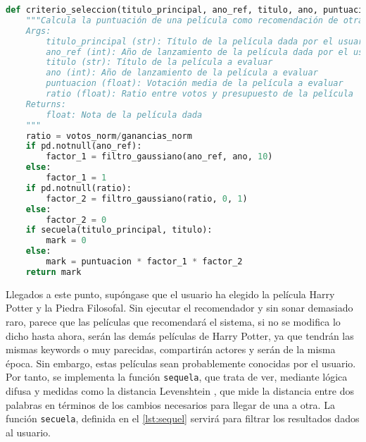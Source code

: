 \begin{lstlisting}[language=Python, caption= {Criterios de selección para la elección de las mejores películas. Se parte de la puntuación de la película y se modifica según la proximidad temporal de la película a evaluar con la película de referencia y el ratio entre votos e ingresos de la película.}, label={lst:criteria}]
def criterio_seleccion(titulo_principal, ano_ref, titulo, ano, puntuacion, votos_norm, ganancias_norm):
    """Calcula la puntuación de una película como recomendación de otra en base a la similaridad de su título, la distancia temporal entre ambos lanzamientos y el número de votos de la película evaluada y la puntuación de la película. Además, la similitud entre títulos se tiene en cuenta para evitar la recomendación de secuelas. Es decir, si dos películas tienen un nombre muy similar, se desechara como recomendación.
    Args:
        titulo_principal (str): Título de la película dada por el usuario
        ano_ref (int): Año de lanzamiento de la película dada por el usuario
        titulo (str): Título de la película a evaluar
        ano (int): Año de lanzamiento de la película a evaluar
        puntuacion (float): Votación media de la película a evaluar
        ratio (float): Ratio entre votos y presupuesto de la película
    Returns:
        float: Nota de la película dada
    """
    ratio = votos_norm/ganancias_norm
    if pd.notnull(ano_ref):
        factor_1 = filtro_gaussiano(ano_ref, ano, 10)
    else:
        factor_1 = 1        
    if pd.notnull(ratio):
        factor_2 = filtro_gaussiano(ratio, 0, 1)
    else:
        factor_2 = 0
    if secuela(titulo_principal, titulo):
        mark = 0
    else:
        mark = puntuacion * factor_1 * factor_2
    return mark
\end{lstlisting}

Llegados a este punto, supóngase que el usuario ha elegido la película Harry Potter y la Piedra Filosofal. Sin ejecutar el recomendador y sin sonar demasiado raro, parece que las películas que recomendará el sistema, si no se modifica lo dicho hasta ahora, serán las demás películas de Harry Potter, ya que tendrán las mismas keywords o muy parecidas, compartirán actores y serán de la misma época. Sin embargo, estas películas sean probablemente conocidas por el usuario. Por tanto, se implementa la función \texttt{sequela}, que trata de ver, mediante lógica difusa y medidas como la distancia Levenshtein \cite{levenshtein}, que mide la distancia entre dos palabras en términos de los cambios necesarios para llegar de una a otra. La función \texttt{secuela}, definida en el \autoref{lst:sequel} servirá para filtrar los resultados dados al usuario.

